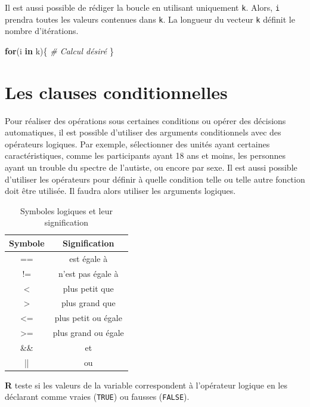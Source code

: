 \documentclass[
]{book}
\newenvironment{Shaded}{}{}
\newcommand{\CommentTok}[1]{\textit{#1}}
\newcommand{\ControlFlowTok}[1]{\textbf{#1}}
\newcommand{\NormalTok}[1]{#1}
\begin{document}
Il est aussi possible de rédiger la boucle en utilisant uniquement \texttt{k}. Alors, \texttt{i} prendra toutes les valeurs contenues dans \texttt{k}. La longueur du vecteur \texttt{k} définit le nombre d'itérations.

\begin{Shaded}
\begin{Highlighting}[]
\ControlFlowTok{for}\NormalTok{(i }\ControlFlowTok{in}\NormalTok{ k)\{}
  \CommentTok{\# Calcul désiré}
\NormalTok{\}}
\end{Highlighting}
\end{Shaded}

\hypertarget{les-clauses-conditionnelles}{%
\section{Les clauses conditionnelles}\label{les-clauses-conditionnelles}}

Pour réaliser des opérations sous certaines conditions ou opérer des décisions automatiques, il est possible d'utiliser des arguments conditionnels avec des opérateurs logiques. Par exemple, sélectionner des unités ayant certaines caractéristiques, comme les participants ayant 18 ans et moins, les personnes ayant un trouble du spectre de l'autiste, ou encore par sexe. Il est aussi possible d'utiliser les opérateurs pour définir à quelle condition telle ou telle autre fonction doit être utilisée. Il faudra alors utiliser les arguments logiques.

\begin{table}[H]

\caption{\label{tab:unnamed-chunk-22}Symboles logiques et leur signification}
\centering
\begin{tabular}[t]{cc}
\toprule
Symbole & Signification\\
\midrule
== & est égale à\\
!= & n'est pas égale à\\
< & plus petit que\\
> & plus grand que\\
<= & plus petit ou égale\\
\addlinespace
>= & plus grand ou égale\\
\&\& & et\\
|| & ou\\
\bottomrule
\end{tabular}
\end{table}

\textbf{R} teste si les valeurs de la variable correspondent à l'opérateur logique en les déclarant comme vraies (\texttt{TRUE}) ou fausses (\texttt{FALSE}).
\end{document}

